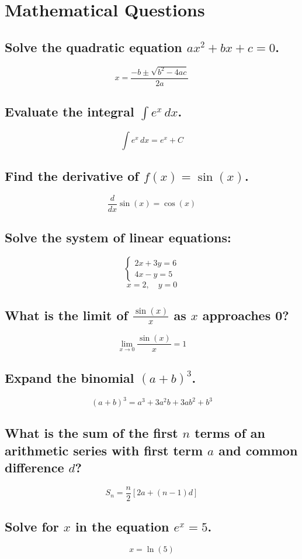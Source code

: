 \section{Mathematical Questions}

\subsection{Solve the quadratic equation \(ax^2 + bx + c = 0\).}
\[
x = \frac{-b \pm \sqrt{b^2 - 4ac}}{2a}
\]

\subsection{Evaluate the integral \(\int e^x \, dx\).}
\[
\int e^x \, dx = e^x + C
\]

\subsection{Find the derivative of \(f(x) = \sin(x)\).}
\[
\frac{d}{dx} \sin(x) = \cos(x)
\]

\subsection{Solve the system of linear equations:}
\[
\begin{cases}
2x + 3y = 6 \\
4x - y = 5
\end{cases}
\]
\[
x = 2, \quad y = 0
\]

\subsection{What is the limit of \(\frac{\sin(x)}{x}\) as \(x\) approaches 0?}
\[
\lim_{x \to 0} \frac{\sin(x)}{x} = 1
\]

\subsection{Expand the binomial \((a + b)^3\).}
\[
(a + b)^3 = a^3 + 3a^2b + 3ab^2 + b^3
\]

\subsection{What is the sum of the first \(n\) terms of an arithmetic series with first term \(a\) and common difference \(d\)?}
\[
S_n = \frac{n}{2} [2a + (n-1)d]
\]

\subsection{Solve for \(x\) in the equation \(e^x = 5\).}
\[
x = \ln(5)
\]
